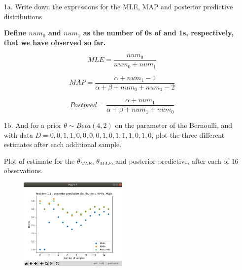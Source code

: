 \documentclass[submit]{harvardml}
\newenvironment{answer}{%
    \color{answergreen}\bf}
  {%
  }
\begin{document}
\newpage
\begin{enumerate}
    \item[1a.] Write down the expressions for the MLE, MAP and posterior predictive distributions

    \begin{answer}
        Define $num_0$ and $num_1$ as the number of 0s of and 1s, respectively,
        that we have observed so far.

        $$ MLE = \frac{num_0}{num_0 + num_1} $$

        $$ MAP =  \frac{
            \alpha+ num_1-1}{
            \alpha+\beta+num_0+num_1-2} $$

        $$ Postpred = \frac{
            \alpha+num_1}{
            \alpha+\beta+num_1+num_0}$$

    \end{answer}

    \item[1b.] And for a prior $\theta\sim Beta(4,2)$ on the parameter of the Bernoulli, and with data $D= 0, 0, 1, 1, 0, 0, 0, 0, 1, 0, 1, 1, 1, 0, 1, 0$, plot the three different estimates after each additional
sample.
    \begin{answer}

        Plot of estimate for the $\theta_{MLE}$, $\theta_{MAP}$, and posterior predictive, after each of 16 observations.
    \begin{figure}[H] \centering
        \includegraphics[width=0.5\textwidth]{Problem1-1.png}
            \caption{}
            \label{Problem 1, part 1.} %
    \end{figure}



\end{answer}
\end{enumerate}
\end{document}
